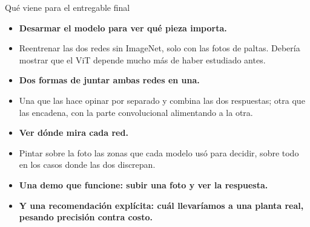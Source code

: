 \documentclass[aspectratio=169,11pt,table]{beamer}
\begin{document}
\begin{frame}{Qué viene para el entregable final}
{\scriptsize
\setlength{\itemsep}{0.25em}
\begin{itemize}
  \item {\bfseries Desarmar el modelo para ver qué pieza importa.}
  \item Reentrenar las dos redes sin ImageNet, solo con las fotos de paltas. Debería mostrar que el ViT depende mucho más de haber estudiado antes.
  \item {\bfseries Dos formas de juntar ambas redes en una.}
  \item Una que las hace opinar por separado y combina las dos respuestas; otra que las encadena, con la parte convolucional alimentando a la otra.
  \item {\bfseries Ver dónde mira cada red.}
  \item Pintar sobre la foto las zonas que cada modelo usó para decidir, sobre todo en los casos donde las dos discrepan.
  \item {\bfseries Una demo que funcione: subir una foto y ver la respuesta.}
  \item {\bfseries Y una recomendación explícita: cuál llevaríamos a una planta real, pesando precisión contra costo.}
\end{itemize}
}
\end{frame}

{
\begin{frame}[plain]
  \vfill
  \vfill
\end{frame}
}
\end{document}
